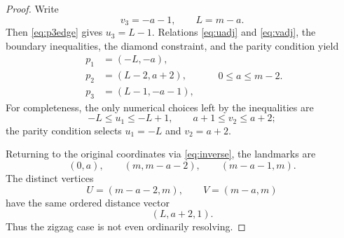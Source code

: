 \documentclass[10pt,a4paper]{amsart}
\begin{document}
\begin{proof}
Write
\[
 v_3=-a-1,
 \qquad
 L=m-a.
\]
Then \eqref{eq:p3edge} gives $u_3=L-1$.  Relations \eqref{eq:uadj} and \eqref{eq:vadj}, the boundary inequalities, the diamond constraint, and the parity condition yield
\begin{equation}\label{eq:zigzagnormal}
\begin{aligned}
 p_1&=(-L,-a),\\
 p_2&=(L-2,a+2),\\
 p_3&=(L-1,-a-1),
\end{aligned}
\qquad
0\le a\le m-2.
\end{equation}
For completeness, the only numerical choices left by the inequalities are
\[
 -L\le u_1\le -L+1,
 \qquad
 a+1\le v_2\le a+2;
\]
the parity condition selects $u_1=-L$ and $v_2=a+2$.

Returning to the original coordinates via \eqref{eq:inverse}, the landmarks are
\[
 (0,a),
 \qquad
 (m,m-a-2),
 \qquad
 (m-a-1,m).
\]
The distinct vertices
\[
 U=(m-a-2,m),
 \qquad
 V=(m-a,m)
\]
have the same ordered distance vector
\[
 (L,a+2,1).
\]
Thus the zigzag case is not even ordinarily resolving.
\end{proof}
\end{document}
